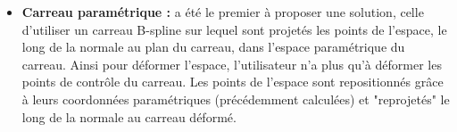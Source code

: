 \begin{itemize}
\item{\textbf{Carreau paramétrique :}} \cite{JLQ96} a été le premier à
  proposer une solution, celle d'utiliser un carreau B-spline sur
  lequel sont projetés les points de l'espace, le long de la normale
  au plan du carreau, dans l'espace paramétrique du carreau. Ainsi
  pour déformer l'espace, l'utilisateur n'a plus qu'à déformer les
  points de contrôle du carreau. Les points de l'espace sont
  repositionnés grâce à leurs coordonnées paramétriques (précédemment
  calculées) et "reprojetés" le long de la normale au carreau déformé.

\end{itemize}
